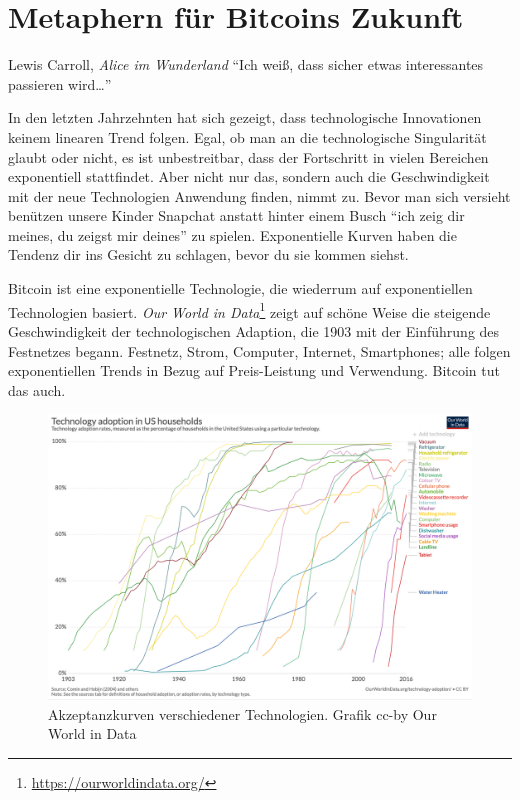 \chapter{Metaphern für Bitcoins Zukunft}
\label{les:21}

\begin{chapquote}{Lewis Carroll, \textit{Alice im Wunderland}}
\enquote{Ich weiß, dass sicher etwas interessantes passieren wird\ldots}
\end{chapquote}

In den letzten Jahrzehnten hat sich gezeigt, dass technologische Innovationen
keinem linearen Trend folgen. Egal, ob man an die technologische Singularität
glaubt oder nicht, es ist unbestreitbar, dass der Fortschritt in vielen
Bereichen exponentiell stattfindet. Aber nicht nur das, sondern auch die
Geschwindigkeit mit der neue Technologien Anwendung finden, nimmt zu. Bevor man
sich versieht benützen unsere Kinder Snapchat anstatt hinter einem Busch
\enquote{ich zeig dir meines, du zeigst mir deines} zu spielen. Exponentielle
Kurven haben die Tendenz dir ins Gesicht zu schlagen, bevor du sie kommen
siehst.

Bitcoin ist eine exponentielle Technologie, die wiederrum auf exponentiellen
Technologien basiert. \textit{Our World in
Data}\footnote{\url{https://ourworldindata.org/}} zeigt auf schöne Weise die
steigende Geschwindigkeit der technologischen Adaption, die 1903 mit der
Einführung des Festnetzes begann. Festnetz, Strom, Computer, Internet,
Smartphones; alle folgen exponentiellen Trends in Bezug auf Preis-Leistung und
Verwendung. Bitcoin tut das auch.

\begin{figure}
  \includegraphics{assets/images/tech-adoption.png}
  \caption{Akzeptanzkurven verschiedener Technologien. Grafik cc-by Our World in Data}
  \label{fig:tech-adoption}
\end{figure}

